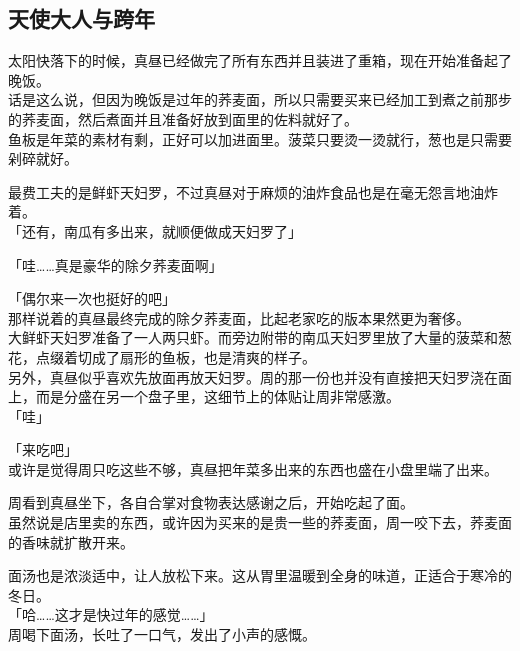 \subsection{天使大人与跨年}

太阳快落下的时候，真昼已经做完了所有东西并且装进了重箱，现在开始准备起了晚饭。\\

话是这么说，但因为晚饭是过年的荞麦面，所以只需要买来已经加工到煮之前那步的荞麦面，然后煮面并且准备好放到面里的佐料就好了。\\

鱼板是年菜的素材有剩，正好可以加进面里。菠菜只要烫一烫就行，葱也是只需要剁碎就好。

最费工夫的是鲜虾天妇罗，不过真昼对于麻烦的油炸食品也是在毫无怨言地油炸着。\\

「还有，南瓜有多出来，就顺便做成天妇罗了」

「哇……真是豪华的除夕荞麦面啊」

「偶尔来一次也挺好的吧」\\

那样说着的真昼最终完成的除夕荞麦面，比起老家吃的版本果然更为奢侈。\\

大鲜虾天妇罗准备了一人两只虾。而旁边附带的南瓜天妇罗里放了大量的菠菜和葱花，点缀着切成了扇形的鱼板，也是清爽的样子。\\

另外，真昼似乎喜欢先放面再放天妇罗。周的那一份也并没有直接把天妇罗浇在面上，而是分盛在另一个盘子里，这细节上的体贴让周非常感激。\\

「哇」

「来吃吧」\\

或许是觉得周只吃这些不够，真昼把年菜多出来的东西也盛在小盘里端了出来。

周看到真昼坐下，各自合掌对食物表达感谢之后，开始吃起了面。\\

虽然说是店里卖的东西，或许因为买来的是贵一些的荞麦面，周一咬下去，荞麦面的香味就扩散开来。

面汤也是浓淡适中，让人放松下来。这从胃里温暖到全身的味道，正适合于寒冷的冬日。\\

「哈……这才是快过年的感觉……」\\

周喝下面汤，长吐了一口气，发出了小声的感慨。\\

